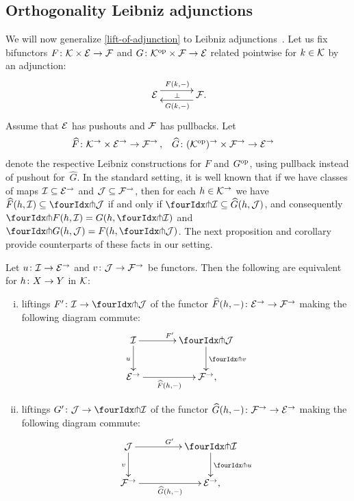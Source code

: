 \documentclass[reqno,10pt,a4paper,oneside,draft]{amsart}
\begin{document}




\subsection*{Orthogonality Leibniz adjunctions}

We will now generalize \cref{lift-of-adjunction} to Leibniz adjunctions~\cite{riehl-verity:reedy}.
Let us fix bifunctors $F \co \cal{K} \times \cal{E} \to \cal{F}$ and $G \co \cal{K}^{\op} \times \cal{F} \to \cal{E}$ related pointwise for $k \in \cal{K}$ by an adjunction:
\[
\xymatrix@C+1em{
  \cal{E}
  \ar@<5pt>[r]^{F(k, \arghole)}
  \ar@{}[r]|{\bot}
&
  \cal{F} \rlap{.}
  \ar@<5pt>[l]^{G(k, \arghole)}
}
\]
Assume that $\cal{E}$ has pushouts and $\cal{F}$ has pullbacks.
Let
\[
\begin{aligned}
  \widehat{F} &\co \cal{K}^\to \times \cal{E}^\to \to \cal{F}^\to
\, ,&
  \widehat{G} &\co (\cal{K}^{\op})^\to \times \cal{F}^\to \to \cal{E}^\to
\end{aligned}
\]
denote the respective Leibniz constructions for $F$ and $G^{\op}$, using pullback instead of pushout for~$\widehat{G}$.
In the standard setting, it is well known that if we have classes of maps $\cal{I} \subseteq \cal{E}^\to$ and $\cal{J} \subseteq \cal{F}^\to$, then for each $h \in \cal{K}^\to$ we have $\widehat{F}(h, \cal{I}) \subseteq \liftl{\cal{J}}$ if and only if $\liftr{\cal{I}} \subseteq \widehat{G}(h, \cal{J})$, and consequently $\liftr{F(h, \cal{I})} = G(h, \liftr{\cal{I}})$ and $\liftl{G(h, \cal{J})} = F(h, \liftl{\cal{J}})$.
The next proposition and corollary provide counterparts of these facts in our setting.

\begin{proposition} \label{lift-of-leibniz-adjunction}
Let $u \co \cal{I} \to \cal{E}^\to$ and $v \co \cal{J} \to \cal{F}^\to$ be functors.
Then the following are equivalent for $h \co X \to Y$ in $\cal{K}$:
\begin{enumerate}[(i)]
\item liftings $F' \co \cal{I} \to \liftl{\cal{J}}$ of the functor $\widehat{F}(h, \arghole) \co \cal{E}^\to \to \cal{F}^\to$ making the following diagram commute:
\[
\xymatrix@C=1.2cm{
  \cal{I}
  \ar[r]^{F'}
  \ar[d]_{u}
&
  \liftl{\cal{J}}
  \ar[d]^{\liftl{v}}
\\
  \cal{E}^\to
  \ar[r]_-{\widehat{F}(h, \arghole)}
&
  \cal{F}^\to
\rlap{,}}
\]
\item liftings $G' \co \cal{J} \to \liftr{\cal{I}}$ of the functor $\widehat{G}(h, \arghole) \co \cal{F}^\to \to \cal{E}^\to$ making the following diagram commute:
\[
\xymatrix@C+2em{
    \cal{J}
      \ar[d]_{v}
      \ar[r]^{G'}
&
  \liftr{\cal{I}}
    \ar[d]^{\liftr{u}}
\\
  \cal{F}^\to
   \ar[r]_-{\widehat{G}(h, \arghole)}
&
  \cal{E}^\to
\rlap{,}}
\]
\end{enumerate}
\end{proposition}
\end{document}
